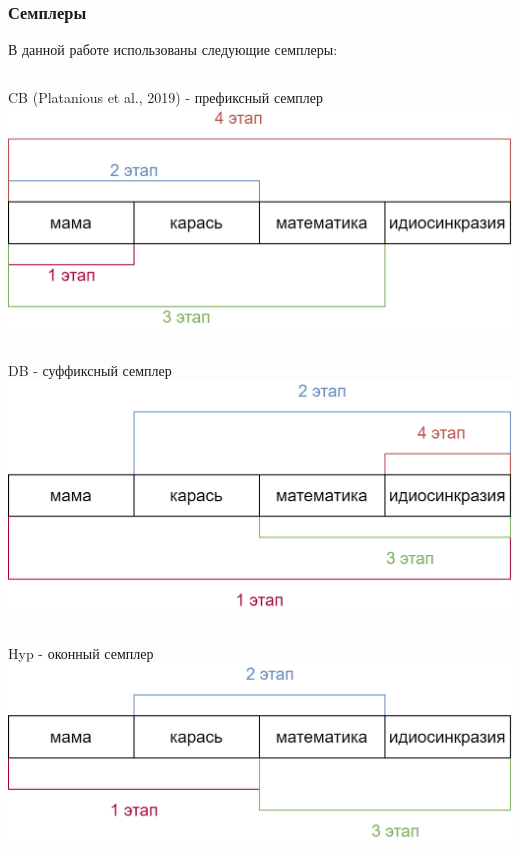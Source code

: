 \documentclass{beamer}
\begin{document}
\begin{frame}
	\frametitle{Семплеры}
	В данной работе использованы следующие семплеры:

\noindent\makebox[\linewidth]{\rule{\paperwidth}{0.4pt}}
	\begin{columns}
		CB (Platanious et al., 2019) - префиксный семплер
		\includegraphics[scale=0.1]{prefix.png}
	\end{columns}
\noindent\makebox[\linewidth]{\rule{\paperwidth}{0.4pt}}
	\begin{columns}
		\column{0.5\textwidth}
		DB - суффиксный семплер
		\column{0.5\textwidth}
		\includegraphics[scale=0.1]{suffix.png}
	\end{columns}
\noindent\makebox[\linewidth]{\rule{\paperwidth}{0.4pt}}
	\begin{columns}
		Hyp - оконный семплер
		\includegraphics[scale=0.1]{window.png}
	\end{columns}
\noindent\makebox[\linewidth]{\rule{\paperwidth}{0.4pt}}
\end{frame}
\end{document}

